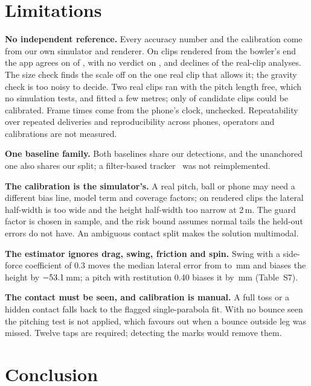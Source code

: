 \documentclass[journal]{IEEEtran}
\begin{document}
\section{Limitations}

\textbf{No independent reference.} Every accuracy number and the calibration come from our own simulator
and renderer. On clips rendered from the bowler's end the app agrees on \EteBowlerAgree{} of \EteBowlerN{},
with no verdict on \EteBowlerNoVerdict, and declines \RealDeclinedRuns{} of the \RealRuns{} real-clip analyses. The size
check finds the scale off on the one real clip that allows it; the gravity check is too noisy to decide. Two real clips ran with the pitch length free, which no simulation tests, and fitted
a few metres; only \RealClipsUsed{} of \RealClipsFound{} candidate clips could be calibrated. Frame times come from the phone's clock, unchecked. Repeatability over repeated deliveries and
reproducibility across phones, operators and calibrations are not measured.

\textbf{One baseline family.} Both baselines share our detections, and the unanchored one also shares our split; a filter-based
tracker~\cite{ghimire2026cricket} was not reimplemented.

\textbf{The calibration is the simulator's.} A real pitch, ball or phone may need a different bias line,
model term and coverage factors; on rendered clips the lateral half-width is too wide and the height
half-width too narrow at 2\,m. The guard factor is chosen in sample, and the risk bound assumes normal tails
the held-out errors do not have. An ambiguous contact split makes the solution multimodal.

\textbf{The estimator ignores drag, swing, friction and spin.} Swing with a side-force coefficient of 0.3
moves the median lateral error from \PhysBaselineMedY{} to \PhysSwingCsZeroThreeMedY\,mm and biases the
height by $-53.1$\,mm; a pitch with restitution 0.40 biases it by
\PhysRestitutionZeroFourZeroMeanZ\,mm (Table~S7).

\textbf{The contact must be seen, and calibration is manual.} A full toss or a hidden contact falls back
to the flagged single-parabola fit. With no bounce seen the pitching test is not applied, which favours
out when a bounce outside leg was missed. Twelve taps are required; detecting the marks would remove them.

\section{Conclusion}
\end{document}
